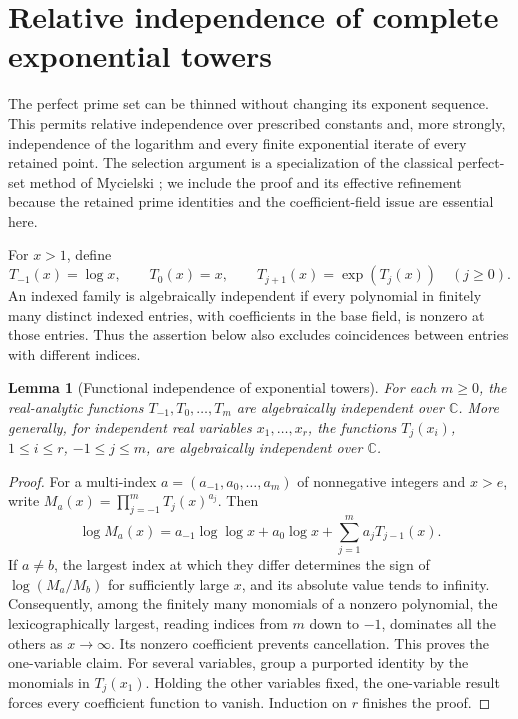 \documentclass[11pt,a4paper]{article}
\newtheorem{lemma}[theorem]{Lemma}
\theoremstyle{definition}
\theoremstyle{remark}
\numberwithin{equation}{section}
\begin{document}
\section{Relative independence of complete exponential towers}\label{fol:sec:relative-towers}
The perfect prime set can be thinned without changing its exponent
sequence. This permits relative independence over prescribed constants
and, more strongly, independence of the logarithm and every finite exponential iterate of
every retained point. The selection argument is a specialization of the
classical perfect-set method of Mycielski \cite{Mycielski1964}; we include
the proof and its effective refinement because the retained prime
identities and the coefficient-field issue are essential here.

For $x>1$, define
\[
 T_{-1}(x)=\log x,\qquad T_0(x)=x,\qquad
 T_{j+1}(x)=\exp(T_j(x))\quad(j\ge0).
\]
An indexed family is algebraically independent if every polynomial in
finitely many distinct indexed entries, with coefficients in the base
field, is nonzero at those entries. Thus the assertion below also
excludes coincidences between entries with different indices.

\begin{lemma}[Functional independence of exponential towers]
\label{fol:lem:tower-functions}
For each $m\ge0$, the real-analytic functions
$T_{-1},T_0,\ldots,T_m$ are algebraically independent over $\mathbb C$.
More generally, for independent real variables $x_1,\ldots,x_r$, the
functions $T_j(x_i)$, $1\le i\le r$, $-1\le j\le m$, are algebraically
independent over $\mathbb C$.
\end{lemma}
\begin{proof}
For a multi-index $a=(a_{-1},a_0,\ldots,a_m)$ of nonnegative integers
and $x>e$, write $M_a(x)=\prod_{j=-1}^mT_j(x)^{a_j}$. Then
\[
 \log M_a(x)=a_{-1}\log\log x+a_0\log x
 +\sum_{j=1}^m a_jT_{j-1}(x).
\]
If $a\ne b$, the largest index at which they differ determines the sign
of $\log(M_a/M_b)$ for sufficiently large $x$, and its absolute value
tends to infinity. Consequently, among the finitely many monomials of a
nonzero polynomial, the lexicographically largest, reading indices from
$m$ down to $-1$, dominates all the others as $x\to\infty$. Its nonzero
coefficient prevents cancellation. This proves the one-variable claim.
For several variables, group a purported identity by the monomials in
$T_j(x_1)$. Holding the other variables fixed, the one-variable result
forces every coefficient function to vanish. Induction on $r$ finishes
the proof.
\end{proof}
\end{document}
